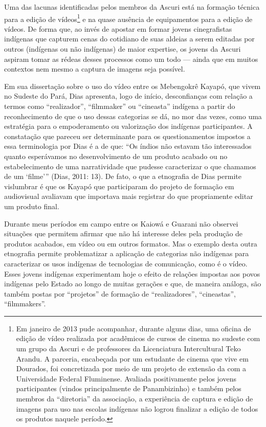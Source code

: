 {{Uma das lacunas identificadas pelos membros da Ascuri está na formação
técnica para a edição de vídeos\footnote{Em janeiro de 2013 pude
acompanhar, durante alguns dias, uma oficina de edição de vídeo
realizada por acadêmicos de cursos de cinema no sudeste com um grupo da
Ascuri e de professores da Licenciatura Intercultural Teko Arandu. A
parceria, encabeçada por um estudante de cinema que vive em Dourados,
foi concretizada por meio de um projeto de extensão da  com a
Universidade Federal Fluminense. Avaliada positivamente pelos jovens
participantes (vindos principalmente de Panambizinho) e também pelos
membros da ``diretoria'' da associação, a experiência de captura e edição
de imagens para uso nas escolas indígenas não logrou finalizar a edição
de todos os produtos naquele período. } e na quase ausência de
equipamentos para a edição de vídeos. De forma que, ao invés de apostar
em formar jovens cinegrafistas indígenas que capturem cenas do
cotidiano de suas aldeias a serem editadas por outros (indígenas ou não
indígenas) de maior expertise, os jovens da Ascuri aspiram tomar as
rédeas desses processos como um todo --- ainda que em muitos contextos
nem mesmo a captura de imagens seja possível.

Em sua dissertação sobre o uso do vídeo entre os Mebengokrê Kayapó, que
vivem no Sudeste do Pará, Dias apresenta, logo de início, desconfianças
com relação a termos como ``realizador'', ``filmmaker'' ou ``cineasta''
indígena a partir do reconhecimento de que o uso dessas categorias se
dá, no mor das vezes, como uma estratégia para o empoderamento ou
valorização dos indígenas participantes. A constatação que pareceu ser
determinante para os questionamentos impostos a essa terminologia por
Dias é a de que: ``Os índios não estavam tão interessados quanto
esperávamos no desenvolvimento de um produto acabado ou no
estabelecimento de uma narratividade que pudesse caracterizar o que
chamamos de um ‘filme’'' (Dias, 2011: 13). De fato, o que a etnografia
de Dias permite vislumbrar é que os Kayapó que participaram do projeto
de formação em audiovisual avaliavam que importava mais registrar do
que propriamente editar um produto final.

Durante meus períodos em campo entre os Kaiowá e Guarani não observei
situações que permitem afirmar que não há interesse deles pela produção
de produtos acabados, em vídeo ou em outros formatos. Mas o exemplo
desta outra etnografia permite problematizar a aplicação de categorias
não indígenas para caracterizar os usos indígenas de tecnologias de
comunicação, como é o vídeo. Esses jovens indígenas experimentam hoje o
efeito de relações impostas aos povos indígenas pelo Estado ao longo de
muitas gerações e que, de maneira análoga, são também postas por
``projetos'' de formação de ``realizadores'', ``cineastas'', ``filmmakers''.

}}
